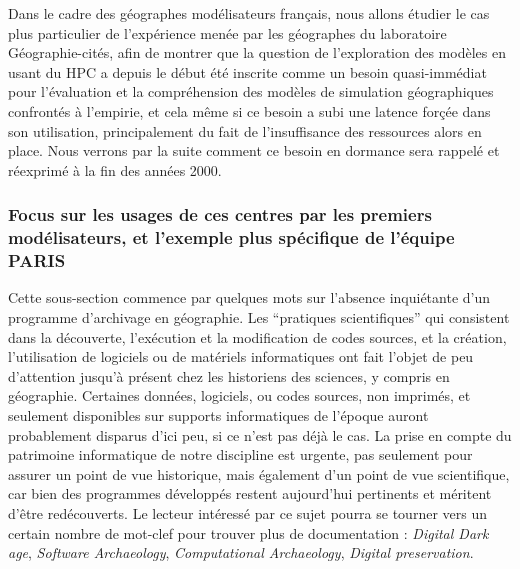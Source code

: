 Dans le cadre des géographes modélisateurs français, nous allons étudier le cas plus particulier de l'expérience menée par les géographes du laboratoire Géographie-cités, afin de montrer que la question de l'exploration des modèles en usant du HPC a depuis le début été inscrite comme un besoin quasi-immédiat pour l'évaluation et la compréhension des modèles de simulation géographiques confrontés à l'empirie, et cela même si ce besoin a subi une latence forçée dans son utilisation, principalement du fait de l'insuffisance des ressources alors en place. Nous verrons par la suite comment ce besoin en dormance sera rappelé et réexprimé à la fin des années 2000.




\subsubsection{Focus sur les usages de ces centres par les premiers modélisateurs, et l'exemple plus spécifique de l'équipe PARIS}
\label{sssec:contexte_modelisateur}

Cette sous-section commence par quelques mots sur l'absence inquiétante d'un programme d'archivage en géographie. Les \enquote{pratiques scientifiques} qui consistent dans la découverte, l’exécution et la modification de codes sources, et la création, l'utilisation de logiciels ou de matériels informatiques ont fait l'objet de peu d'attention jusqu'à présent chez les historiens des sciences, y compris en géographie. Certaines données, logiciels, ou codes sources, non imprimés, et seulement disponibles sur supports informatiques de l'époque auront probablement disparus d'ici peu, si ce n'est pas déjà le cas. La prise en compte du patrimoine informatique de notre discipline est urgente, pas seulement pour assurer un point de vue historique, mais également d'un point de vue scientifique, car bien des programmes développés restent aujourd'hui pertinents et méritent d'être redécouverts. Le lecteur intéressé par ce sujet pourra se tourner vers un certain nombre de mot-clef pour trouver plus de documentation : \textit{Digital Dark age}, \textit{Software Archaeology}, \textit{Computational Archaeology}, \textit{Digital preservation}.

